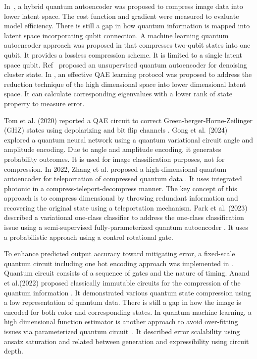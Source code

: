 In~\cite{wang2024quantum}, a hybrid quantum autoencoder was proposed to compress image data into lower latent space. The cost function and gradient were measured to evaluate model efficiency. There is still a gap in how quantum information is mapped into latent space incorporating qubit connection. A machine learning quantum autoencoder approach was proposed in \cite{huang2020realization} that compresses two-qubit states into one qubit. It provides a lossless compression scheme. It is limited to a single latent space qubit. Ref~\cite{bondarenko2020quantum} proposed an unsupervised quantum autoencoder for denoising cluster state. In \cite{du2021exploring}, an effective QAE  learning protocol was proposed to address the reduction technique of the high dimensional space into lower dimensional latent space. It can calculate corresponding eigenvalues with a lower rank of state property to measure error. 

Tom et al. (2020) reported a QAE circuit to correct Green-berger-Horne-Zeilinger (GHZ) states using depolarizing and bit flip channels \cite{achache2020denoising}. Gong et al. (2024) explored a quantum neural network using a quantum variational circuit angle and amplitude encoding. Due to angle and amplitude encoding, it generates probability outcomes. It is used for image classification purposes, not for compression. In 2022, Zhang et al. proposed a high-dimensional quantum autoencoder for teleportation of compressed quantum data \cite{zhang2022resource}. It uses integrated photonic in a compress-teleport-decompress manner. The key concept of this approach is to compress dimensional by throwing redundant information and recovering the original state using a teleportation mechanism. Park et al. (2023) described a variational one-class classifier to address the one-class classification issue using a semi-supervised fully-parameterized quantum autoencoder \cite{park2023variational}. It uses a probabilistic approach using a control rotational gate. 

To enhance predicted output accuracy toward mitigating error, a fixed-scale quantum circuit including one hot encoding approach was implemented in \cite{li2024quantum}. Quantum circuit consists of a sequence of gates and the nature of timing. Anand et al.(2022) proposed classically immutable circuits for the compression of the quantum information \cite{anand2022quantum}. It demonstrated various quantum state compression using a low representation of quantum data. There is still a gap in how the image is encoded for both color and corresponding states. In quantum machine learning, a high dimensional function estimator is another approach to avoid over-fitting issues via parameterized quantum circuit~\cite{chen2021expressibility}. It described error scalability using ansatz saturation and related between generation and expressibility using circuit depth.  

